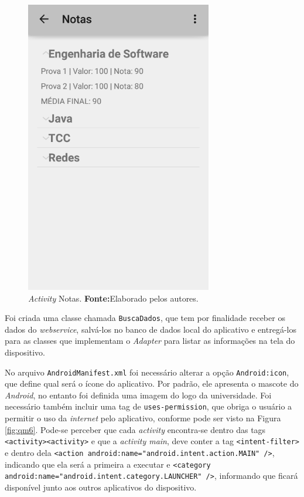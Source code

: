 	\begin{figure}[h!]
			\centerline{\includegraphics[scale=0.5]{./imagens/2_q_metodologico/qm5.png}}
			\caption[\textit{Activity} Notas]{\textit{Activity} Notas.
			 \textbf{Fonte:}Elaborado pelos autores.}
			\label{fig:qm5}
		\end{figure}
		
	\par Foi criada uma classe chamada \texttt{BuscaDados}, que tem por finalidade
receber os dados do \textit{webservice}, salvá-los no banco de dados local do
aplicativo e entregá-los para as classes que implementam o \textit{Adapter}
para listar as informações na tela do dispositivo.
	
	\par No arquivo \texttt{AndroidManifest.xml} foi necessário alterar a opção
\texttt{Android:icon}, que define qual será o ícone do aplicativo. Por padrão,
ele apresenta o mascote do \textit{Android}, no entanto foi definida uma imagem
do logo da universidade. Foi necessário também incluir uma tag de
\texttt{uses-permission}, que obriga o usuário a permitir o uso da
\textit{internet} pelo aplicativo, conforme pode ser visto na Figura
\ref{fig:qm6}. Pode-se perceber que cada \textit{activity} encontra-se
dentro das tags \texttt{<activity><\/activity>} e que a \textit{activity main},
deve conter a tag \texttt{<intent-filter>} e dentro dela {\tiny{\texttt{<action
android:name="android.intent.action.MAIN" />}}}, indicando que
ela será a primeira a executar e {\tiny{\texttt{<category
android:name="android.intent.category.LAUNCHER" />}}}, informando que ficará
disponível junto aos outros aplicativos do dispositivo.
	
